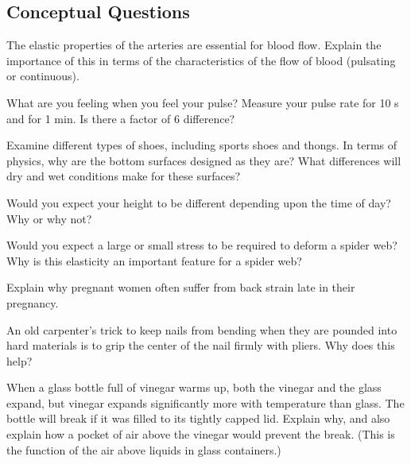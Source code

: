 \documentclass[
]{book}
\newenvironment{conceptual-questions}{}{}
\begin{document}
\hypertarget{fs-id1165298807240}{}
\begin{conceptual-questions}

\hypertarget{conceptual-questions-20}{%
\subsection{Conceptual Questions}\label{conceptual-questions-20}}

\hypertarget{fs-id1165298797418}{}
\leavevmode\hypertarget{fs-id1165298797419}{}%
The elastic properties of the arteries are essential for blood flow.
Explain the importance of this in terms of the characteristics of the
flow of blood (pulsating or continuous).

\hypertarget{fs-id1165298867810}{}
\leavevmode\hypertarget{fs-id1165298867811}{}%
What are you feeling when you feel your pulse? Measure your pulse rate
for 10 s and for 1 min. Is there a factor of 6 difference?

\hypertarget{fs-id1165296252981}{}
\leavevmode\hypertarget{fs-id1165298517998}{}%
Examine different types of shoes, including sports shoes and thongs. In
terms of physics, why are the bottom surfaces designed as they are? What
differences will dry and wet conditions make for these surfaces?

\hypertarget{fs-id1165298840083}{}
\leavevmode\hypertarget{fs-id1165298840084}{}%
Would you expect your height to be different depending upon the time of
day? Why or why not?

\hypertarget{fs-id1165298650751}{}
\leavevmode\hypertarget{fs-id1165298619439}{}%
Would you expect a large or small stress to be required to deform a
spider web? Why is this elasticity an important feature for a spider
web?

\hypertarget{fs-id1165298550516}{}
\leavevmode\hypertarget{fs-id1165298550517}{}%
Explain why pregnant women often suffer from back strain late in their
pregnancy.

\hypertarget{fs-id1165298545438}{}
\leavevmode\hypertarget{fs-id1165298545440}{}%
An old carpenter's trick to keep nails from bending when they are
pounded into hard materials is to grip the center of the nail firmly
with pliers. Why does this help?

\hypertarget{fs-id1165298771893}{}
\leavevmode\hypertarget{fs-id1165298771894}{}%
When a glass bottle full of vinegar warms up, both the vinegar and the
glass expand, but vinegar expands significantly more with temperature
than glass. The bottle will break if it was filled to its tightly capped
lid. Explain why, and also explain how a pocket of air above the vinegar
would prevent the break. (This is the function of the air above liquids
in glass containers.)

\end{conceptual-questions}
\end{document}
